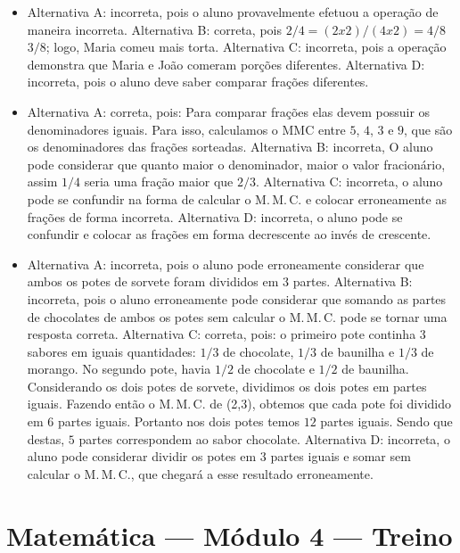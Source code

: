\begin{itemize}
\item Alternativa A: incorreta, pois o aluno provavelmente efetuou a operação
de maneira incorreta.
Alternativa B: correta, pois $2/4 = (2 x 2) / (4 x 2) = 4/8$
$3/8$; logo, Maria comeu mais torta.
Alternativa C: incorreta, pois a operação demonstra que Maria e João
comeram porções diferentes.
Alternativa D: incorreta, pois o aluno deve saber comparar frações
diferentes.

\item Alternativa A: correta, pois: Para comparar frações elas devem possuir os denominadores iguais. Para isso, calculamos o MMC entre $5$, $4$, $3$ e $9$, que são os denominadores das frações sorteadas.
Alternativa B: incorreta, O aluno pode considerar que quanto maior o
denominador, maior o valor fracionário, assim $1/4$ seria uma fração maior
que $2/3$.
Alternativa C: incorreta, o aluno pode se confundir na forma de calcular
o M.\,M.\,C. e colocar erroneamente as frações de forma incorreta.
Alternativa D: incorreta, o aluno pode se confundir e colocar as frações
em forma decrescente ao invés de crescente.

\item Alternativa A: incorreta, pois o aluno pode erroneamente considerar que
ambos os potes de sorvete foram divididos em $3$ partes.
Alternativa B: incorreta, pois o aluno erroneamente pode considerar que
somando as partes de chocolates de ambos os potes sem calcular o M.\,M.\,C.
pode se tornar uma resposta correta.
Alternativa C: correta, pois: o primeiro pote continha $3$ sabores em
iguais quantidades: $1/3$ de chocolate, $1/3$ de baunilha e $1/3$ de morango.
No segundo pote, havia $1/2$ de chocolate e $1/2$ de baunilha. Considerando
os dois potes de sorvete, dividimos os dois potes em partes iguais.
Fazendo então o M.\,M.\,C. de (2,3), obtemos que cada pote foi dividido em $6$
partes iguais. Portanto nos dois potes temos $12$ partes iguais. Sendo que
destas, $5$ partes correspondem ao sabor chocolate.
Alternativa D: incorreta, o aluno pode considerar dividir os potes em $3$
partes iguais e somar sem calcular o M.\,M.\,C., que chegará a esse
resultado erroneamente.
\end{itemize}

\section*{Matemática — Módulo 4 — Treino}

